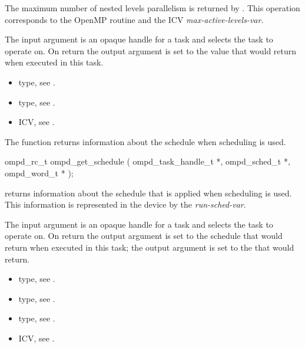 \descr
The maximum number of nested levels parallelism is returned by
.
This operation corresponds to the OpenMP routine
and the ICV \emph{max-active-levels-var}.%

\argdesc
The input argument  is an opaque handle for a task and selects the task to operate on.
On return the output argument  is set to the value that  would return when
executed in this task.

\crossreferences
\begin{itemize}
	\item {} type, see .
	\item {} type, see .
	\item {} ICV, see .
\end{itemize}

\label{ompd:ompd_get_schedule}
\summary
The  function returns information about the schedule when  scheduling is used.

\format
\begin{cspecific}
\begin{ompSyntax}
ompd_rc_t ompd_get_schedule (
  ompd_task_handle_t *,
  ompd_sched_t *,
  ompd_word_t *
);
\end{ompSyntax}
\end{cspecific}

\descr

 returns information about the schedule that is
applied when  scheduling is used.
%
This information is represented in the device by the
\emph{run-sched-var}.

\argdesc
The input argument  is an opaque handle for a task and selects the task to operate on.
On return the output argument  is set to the schedule that  would return when
executed in this task; the output argument  is set to the  that 
 would return.


\crossreferences
\begin{itemize}
	\item {} type, see .
	\item {} type, see .
	\item {} type, see .
	\item {} ICV, see .
\end{itemize}


